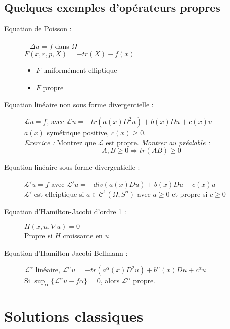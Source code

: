 \subsection{Quelques exemples d'opérateurs propres}
\begin{description}
\item[Equation de Poisson : ] $-\Delta u=f$ dans $\Omega$\\
$F(x,r,p,X)=-tr(X)-f(x)$
\begin{itemize}
	\item $F$ uniformément elliptique
	\item $F$ propre
\end{itemize}

\item[Equation linéaire non sous forme divergentielle :] $\mathscr{L}u=f$, avec $\mathscr{L}u=-tr(a(x)D^2u)+b(x)Du+c(x)u$\\
$a(x)$ symétrique positive, $c(x)\geq 0$. \\
\textit{Exercice :} Montrez que $\mathscr{L}$ est propre. \textit{Montrer au préalable :} \[A,B\geq 0 \Rightarrow tr(AB)\geq 0\]

\item[Equation linéaire sous forme divergentielle :] $\mathscr{L}'u=f$ avec $\mathscr{L}'u=-div(a(x)Du)+b(x)Du+c(x)u$\\
$\mathscr{L}'$ est elleiptique si $a\in\mathscr{C}^1(\Omega,S^n)$ avec $a\geq 0$ et propre si $c\geq 0$

\item[Equation d'Hamilton-Jacobi d'ordre 1 : ] $H(x,u,\nabla u)=0$\\
Propre si $H$ croissante en $u$

\item[Equation d'Hamilton-Jacobi-Bellmann : ] $\mathscr{L}^\alpha$ linéaire, $\mathscr{L}^\alpha u=-tr(a^\alpha(x)D^2u)+b^\alpha(x)Du+c^\alpha u$\\
Si $\sup_\alpha \{\mathscr{L}^\alpha u-f\alpha\}=0$, alors $\mathscr{L}^\alpha$ propre.
\end{description}

\section{Solutions classiques}

